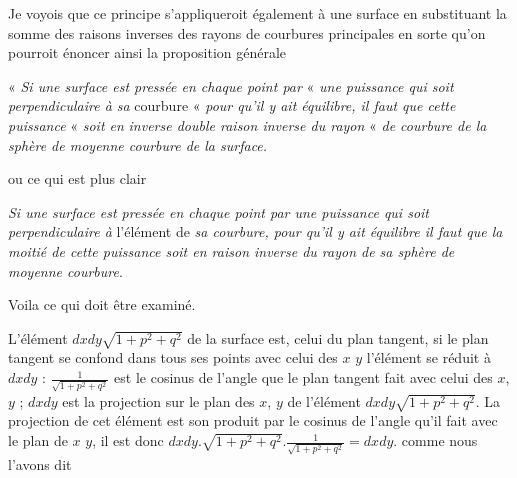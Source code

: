 \documentclass[11pt,a4paper]{article}
\begin{document}
Je voyois que ce principe s'appliqueroit également à une surface en
substituant la somme des  raisons inverses des rayons de
courbures principales en sorte qu'on pourroit énoncer ainsi la proposition
générale

« \emph{Si une surface est pressée en chaque point par} « \emph{une puissance
qui soit perpendiculaire à sa}  courbure « \emph{pour
qu'il y ait équilibre, il faut que cette puissance} « \emph{soit en}
 \emph{inverse double raison inverse du rayon} « \emph{de
courbure de la sphère de moyenne courbure de la surface.}

ou ce qui est plus clair

\emph{Si une surface est pressée en chaque point par une puissance qui soit
perpendiculaire à} l'élément de \emph{sa courbure, pour qu'il y ait équilibre
il faut que la moitié de cette puissance soit en raison inverse du rayon de sa
sphère de moyenne courbure}.


Voila ce qui doit être examiné.

L'élément $dxdy\sqrt{1 + p^2 + q^2}$ de la surface est,  celui du plan tangent, si le plan tangent se confond dans tous ses
points avec celui des $x$ $y$ l'élément se réduit à $dxdy$ :
$\frac{1}{\sqrt{1 + p^2 + q^2}}$ est le cosinus de l'angle que le plan
tangent fait avec celui des $x$, $y$ ; $dxdy$ est la projection sur le plan
des $x$, $y$ de l'élément $dxdy\sqrt{1 + p^2 + q^2}$. La projection de cet
élément est son produit par le cosinus de l'angle qu'il fait avec le plan de
$x$ $y$, il est donc
$dxdy.\sqrt{1 + p^2 + q^2}.\frac{1}{\sqrt{1 + p^2 + q^2}} = dxdy$. comme nous
l'avons dit
\end{document}
